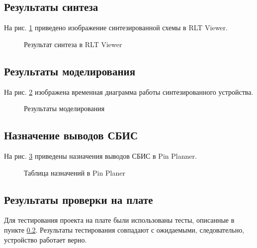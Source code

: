 %

\subsection{Результаты синтеза}

На рис. \ref{fig:lab3_2_rtl} приведено изображение синтезированной схемы в RLT Viewer.

\begin{figure}[H]
\begin{center}
	\caption{Результат синтеза в RLT Viewer}
	\label{fig:lab3_2_rtl}
\end{center}
\end{figure}

\subsection{Результаты моделирования}
\label{sec:lab3_2_modeling}

На рис. \ref{fig:lab3_2_modeling} изображена временная диаграмма работы синтезированного устройства.

\begin{figure}[H]
\begin{center}
	\caption{Результаты моделирования}
	\label{fig:lab3_2_modeling}
\end{center}
\end{figure}

\subsection{Назначение выводов СБИС}

На рис. \ref{fig:lab3_2_pins} приведены назначения выводов СБИС в Pin Planner.

\begin{figure}[H]
\begin{center}
	\caption{Таблица назначений в Pin Planer}
	\label{fig:lab3_2_pins}
\end{center}
\end{figure}

\subsection{Результаты проверки на плате}

Для тестирования проекта на плате были использованы тесты, описанные в пункте \ref{sec:lab3_2_modeling}. Результаты тестирования совпадают с ожидаемыми, следовательно, устройство работает верно.

